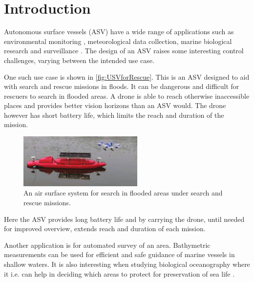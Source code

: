 \chapter{Introduction}

Autonomous surface vessels (ASV) have a wide range of applications such as environmental monitoring \cite[p. 745]{MAHsieh}, meteorological data collection, marine biological research and surveillance \cite[p. 8-10]{FFahimi}.
The design of an ASV raises some interesting control challenges, varying between the intended use case.

One such use case is shown in \autoref{fig:USVforRescue}. 
This is an ASV designed to aid with search and rescue missions in floods. 
It can be dangerous and difficult for rescuers to search in flooded areas. 
A drone is able to reach otherwise inaccessible places and provides better vision horizons than an ASV would. 
The drone however has short battery life, which limits the reach and duration of the mission.
%
\begin{figure}[H]
  \vspace{3mm}
  \includegraphics[width=0.55\textwidth]{figures/USVforRescue.pdf}
  \caption{An air surface system for search in flooded areas under search and rescue missions. \cite{JZhang}}
  \label{fig:USVforRescue}
\end{figure}
%
Here the ASV provides long battery life and by carrying the drone, until needed for improved overview, extends reach and duration of each mission. \cite{JZhang}



Another application is for automated survey of an area.
Bathymetric measurements can be used for efficient and safe guidance of marine vessels in shallow waters. 
It is also interesting when studying biological oceanography where it i.e. can help in deciding which areas to protect for preservation of sea life \cite{NOService}. 


